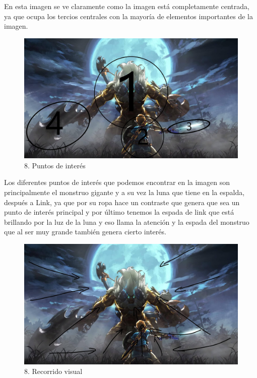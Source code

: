 \documentclass[12pt]{article}
\begin{document}
En esta imagen se ve claramente como la imagen está completamente centrada, ya que ocupa los tercios centrales con la mayoría de elementos importantes de la imagen.

\begin{figure}[H]
      \centering
      \includegraphics[scale=0.25]{images/Raúl/Sección 8/Imagen 8 p. interes.jpg}
      \caption{\small 8. Puntos de interés}
    \end{figure}

Los diferentes puntos de interés que podemos encontrar en la imagen son principalmente el monstruo gigante y a su vez la luna que tiene en la espalda, después a Link, ya que por su ropa hace un contraste que genera que sea un punto de interés principal y por último tenemos la espada de link que está brillando por la luz de la luna y eso llama la atención y la espada del monstruo que al ser muy grande también genera cierto interés.

\begin{figure}[H]
      \centering
      \includegraphics[scale=0.25]{images/Raúl/Sección 8/Imagen 8 recorridos.jpg}
      \caption{\small 8. Recorrido visual}
    \end{figure}
\end{document}

